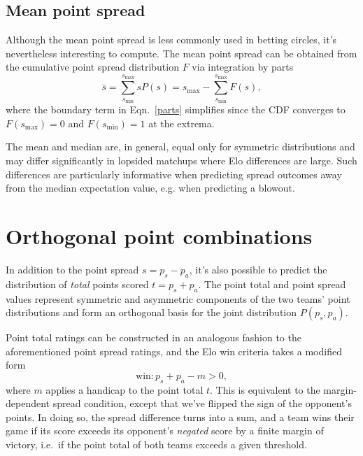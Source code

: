 \documentclass[aps,prc,reprint,amsmath,superscriptaddress]{revtex4-1}
\begin{document}
\subsection{Mean point spread}

Although the mean point spread is less commonly used in betting circles, it's nevertheless interesting to compute.
The mean point spread can be obtained from the cumulative point spread distribution $F$ via integration by parts
\begin{equation}
  \label{parts}
  \bar{s} = \sum\limits_{s_\text{min}}^{s_\text{max}} s P(s) = s_\text{max} - \sum\limits_{s_\text{min}}^{s_\text{max}} F(s),
\end{equation}
where the boundary term in Eqn.~\ref{parts} simplifies since the CDF converges to $F(s_\text{max})=0$ and $F(s_\text{min})=1$ at the extrema.

The mean and median are, in general, equal only for symmetric distributions and may differ significantly in lopsided matchups where Elo differences are large.
Such differences are particularly informative when predicting spread outcomes away from the median expectation value, e.g. when predicting a blowout. 

\section{Orthogonal point combinations}

In addition to the point spread $s = p_s - p_a$, it's also possible to predict the distribution of \emph{total} points scored $t = p_s + p_a$.
The point total and point spread values represent symmetric and asymmetric components of the two teams' point distributions and form an orthogonal basis for the joint distribution $P(p_s, p_a)$. 

Point total ratings can be constructed in an analogous fashion to the aforementioned point spread ratings, and the Elo win criteria takes a modified form
\begin{equation}
  \label{win_total}
  \text{win}: p_s + p_a - m > 0,
\end{equation}
where $m$ applies a handicap to the point total $t$.
This is equivalent to the margin-dependent spread condition, except that we've flipped the sign of the opponent's points.
In doing so, the spread difference turns into a sum, and a team wins their game if its score exceeds its opponent's \emph{negated} score by a finite margin of victory, i.e.\ if the point total of both teams exceeds a given threshold.
\end{document}
